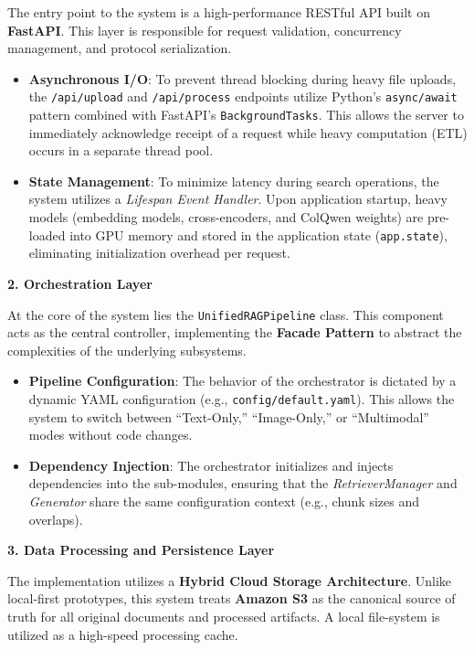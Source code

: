The entry point to the system is a high-performance RESTful API built on \textbf{FastAPI}. This layer is responsible for request validation, concurrency management, and protocol serialization.
\begin{itemize}
    \item \textbf{Asynchronous I/O}: To prevent thread blocking during heavy file uploads, the \texttt{/api/upload} and \texttt{/api/process} endpoints utilize Python's \texttt{async/await} pattern combined with FastAPI's \texttt{BackgroundTasks}. This allows the server to immediately acknowledge receipt of a request while heavy computation (ETL) occurs in a separate thread pool.
    \item \textbf{State Management}: To minimize latency during search operations, the system utilizes a \textit{Lifespan Event Handler}. Upon application startup, heavy models (embedding models, cross-encoders, and ColQwen weights) are pre-loaded into GPU memory and stored in the application state (\texttt{app.state}), eliminating initialization overhead per request.
\end{itemize}

\textbf{2. Orchestration Layer}

At the core of the system lies the \texttt{UnifiedRAGPipeline} class. This component acts as the central controller, implementing the \textbf{Facade Pattern} to abstract the complexities of the underlying subsystems.
\begin{itemize}
    \item \textbf{Pipeline Configuration}: The behavior of the orchestrator is dictated by a dynamic YAML configuration (e.g., \texttt{config/default.yaml}). This allows the system to switch between ``Text-Only,'' ``Image-Only,'' or ``Multimodal'' modes without code changes.
    \item \textbf{Dependency Injection}: The orchestrator initializes and injects dependencies into the sub-modules, ensuring that the \textit{RetrieverManager} and \textit{Generator} share the same configuration context (e.g., chunk sizes and overlaps).
\end{itemize}


\textbf{3. Data Processing and Persistence Layer}

The implementation utilizes a \textbf{Hybrid Cloud Storage Architecture}. Unlike local-first prototypes, this system treats \textbf{Amazon S3} as the canonical source of truth for all original documents and processed artifacts. A local file-system is utilized as a high-speed processing cache.


